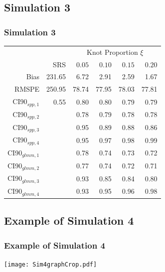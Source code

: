 \documentclass[mathserif,compress]{beamer}
\begin{document}
\subsection{Simulation 3}
\begin{frame}
\frametitle{Simulation 3}

\begin{table}[ht]
\begin{center}
\begin{tabular}{rrrrrr}
	\hline
	&  & \multicolumn{4}{c}{Knot Proportion $\xi$} \\ 
	& SRS & $0.05$ & $0.10$ & $0.15$ & $0.20$ \\ 
	\hline
	Bias & 231.65 & 6.72 & 2.91 & 2.59 & 1.67 \\ 
  RMSPE & 250.95 & 78.74 & 77.95 & 78.03 & 77.81 \\ 
  CI90$_{spp,1}$ & 0.55 & 0.80 & 0.80 & 0.79 & 0.79 \\ 
  CI90$_{spp,2}$ &  & 0.78 & 0.79 & 0.78 & 0.78 \\ 
  CI90$_{spp,3}$ &  & 0.95 & 0.89 & 0.88 & 0.86 \\ 
  CI90$_{spp,4}$ &  & 0.95 & 0.97 & 0.98 & 0.99 \\ 
  CI90$_{glmm,1}$ &  & 0.78 & 0.74 & 0.73 & 0.72 \\ 
  CI90$_{glmm,2}$ &  & 0.77 & 0.74 & 0.72 & 0.71 \\ 
  CI90$_{glmm,3}$ &  & 0.93 & 0.85 & 0.84 & 0.80 \\ 
  CI90$_{glmm,4}$ &  & 0.93 & 0.95 & 0.96 & 0.98 \\ 
   \hline
\end{tabular}
\end{center}
\end{table}

\end{frame}


\subsection{Example of Simulation 4}
\begin{frame}
\frametitle{Example of Simulation 4}

	\begin{center} 
		\texttt{[image: Sim4graphCrop.pdf]} 
	\end{center}

\end{frame}
\end{document}
